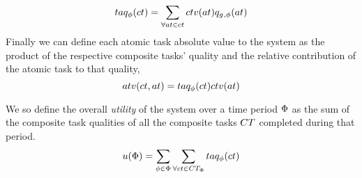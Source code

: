\begin{equation}
\functionCompositeTaskQuality{}{} = \sum\limits_{\forall \varAtomicTask{}{} \in \varCompositeTask{}{}}
\functionCompositeTaskValue{}{}\functionAtomicTaskQualitySignature{}{}	
\end{equation}
Finally we can define each atomic task absolute value to the system as the product of the respective composite tasks' quality and the relative contribution of the atomic task to that quality,
\begin{equation}
	\functionTaskAbsoluteValue{}{} = 
	\functionCompositeTaskQuality{}{}\functionCompositeTaskValue{}{}
\end{equation}

We so define the overall \textit{ utility} of the system over a time period $\Phi$ as the sum of the composite task qualities of all the composite tasks $\setCompositeTask{}{}$ completed during that period.
	\begin{equation}
		\label{eq:system_utility}
		\functionSystemUtility{}{} = \sum\limits_{\varTime{}{} \in \setTime{}{}}
		\sum\limits_{\forall \varCompositeTask{}{} \in \setCompositeTask{\setTime{}{}}{}}
		\functionCompositeTaskQuality{}{}
	\end{equation}